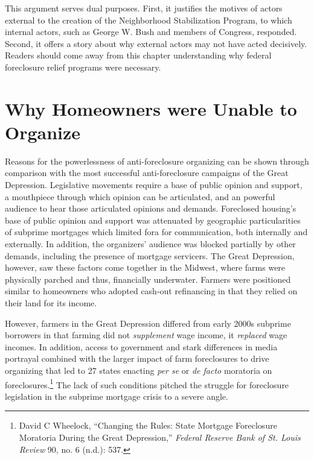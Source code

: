 \documentclass[12pt,oneside]{psthesis}
\begin{document}
This argument serves dual purposes.
First, it justifies the motives of actors external to the creation of the Neighborhood Stabilization Program, to which internal actors, such as George W. Bush and members of Congress, responded.
Second, it offers a story about why external actors may not have acted decisively.
Readers should come away from this chapter understanding why federal foreclosure relief programs were necessary.

\hypertarget{homeowners}{%
\section{Why Homeowners were Unable to Organize}\label{homeowners}}

Reasons for the powerlessness of anti-foreclosure organizing can be shown through comparison with the most successful anti-foreclosure campaigns of the Great Depression.
Legislative movements require a base of public opinion and support, a mouthpiece through which opinion can be articulated, and an powerful audience to hear those articulated opinions and demands.
Foreclosed housing's base of public opinion and support was attenuated by geographic particularities of subprime mortgages which limited fora for communication, both internally and externally.
In addition, the organizers' audience was blocked partially by other demands, including the presence of mortgage servicers.
The Great Depression, however, saw these factors come together in the Midwest, where farms were physically parched and thus, financially underwater.
Farmers were positioned similar to homeowners who adopted cash-out refinancing in that they relied on their land for its income.

However, farmers in the Great Depression differed from early 2000s subprime borrowers in that farming did not \emph{supplement} wage income, it \emph{replaced} wage incomes.
In addition, access to government and stark differences in media portrayal combined with the larger impact of farm foreclosures to drive organizing that led to 27 states enacting \emph{per se} or \emph{de facto} moratoria on foreclosures.\footnote{David C Wheelock, ``Changing the Rules: State Mortgage Foreclosure Moratoria During the Great Depression,'' \emph{Federal Reserve Bank of St. Louis Review} 90, no. 6 (n.d.): 537.}
The lack of such conditions pitched the struggle for foreclosure legislation in the subprime mortgage crisis to a severe angle.
\end{document}
